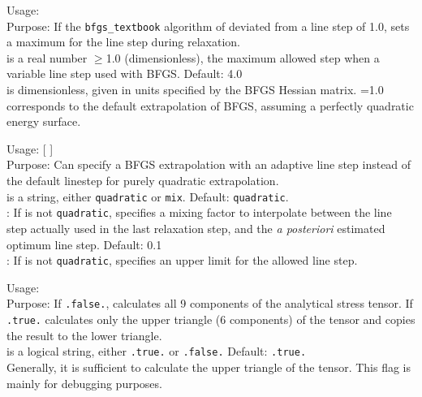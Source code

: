 {
  \noindent
  Usage:   \\[1.0ex]
  Purpose: If the \texttt{bfgs\_textbook} algorithm of 
    deviated from a line step of 1.0, sets a maximum for the line step
    during relaxation. \\[1.0ex] 
   is a real number $\ge$1.0 (dimensionless), the
    maximum allowed step when a variable line step used with
    BFGS. Default: 4.0 \\
}
 is dimensionless, given in units specified by the BFGS
Hessian matrix. =1.0 corresponds to the default
extrapolation of BFGS, assuming a perfectly quadratic energy surface.


{  

  \noindent
  Usage:   [ ] \\[1.0ex]
  Purpose: Can specify a BFGS extrapolation with an adaptive line
    step instead of the default linestep for purely quadratic
    extrapolation. \\[1.0ex]
   is a string, either \texttt{quadratic} or
  \texttt{mix}. Default: \texttt{quadratic}. \\
   : If  is not \texttt{quadratic},
    specifies a mixing factor to interpolate between the line step
    actually used in the last relaxation step, and the \emph{a
    posteriori} estimated optimum line step. Default: 0.1 \\
   : If  is not \texttt{quadratic},
    specifies an upper limit for the allowed line step. \\
}

{
  \noindent
  Usage:   \\[1.0ex]
  Purpose: If \texttt{.false.}, calculates all 9 components of the analytical
  stress tensor. If \texttt{.true.} calculates only the upper triangle (6
  components) of the tensor and copies the result to the lower triangle. \\[1.0ex] 
   is a logical string, either \texttt{.true.} or
    \texttt{.false.} Default: \texttt{.true.}\\
}
Generally, it is sufficient to calculate the upper triangle of the
tensor. This flag is mainly for debugging purposes.

